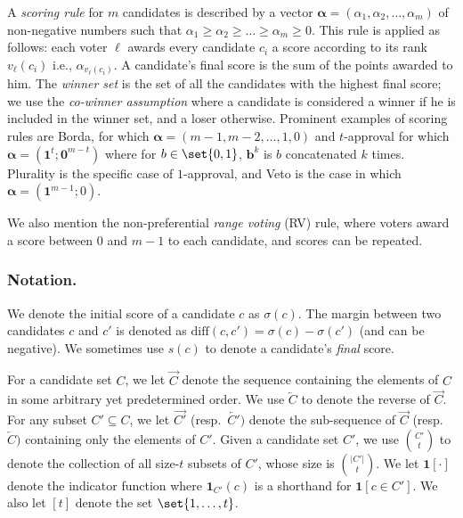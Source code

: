 \documentclass[letterpaper]{article} %
\newcommand{\indic}{\mathbf{1}}
\newcommand{\vecc}{\mathbf}
\newcommand{\vecgreek}{\bm}
\newcommand{\veca}{\vecgreek{\alpha}}
\newcommand{\ora}[1]{\overrightarrow{#1}}
\newcommand{\ola}[1]{\overleftarrow{#1}}
\newcommand{\abs}[1]{\lvert{#1}\rvert}
\newcommand{\diff}{\mathrm{diff}}
\begin{document}
A \emph{scoring rule} for $m$ candidates is described by a vector $\veca=\left(\alpha_1,\alpha_2,\ldots,\alpha_m\right)$ of non-negative numbers such that $\alpha_1 \geq \alpha_2 \geq \dots \geq \alpha_m \geq 0$.
This rule is applied as follows: each voter $\ell$ awards every candidate $c_i$ a score according to its rank $v_\ell(c_i)$ i.e., $\alpha_{v_\ell(c_i)}$. A candidate's final score is the sum of the points awarded to him.
The \emph{winner set} is the set of all the candidates with the highest final score; we use the \emph{co-winner assumption} where a candidate is considered a winner if he is included in the winner set, and a loser otherwise. Prominent examples of scoring rules are  Borda, for which  $\veca=(m-1,m-2,\ldots,1,0)$ and $t$-approval for which $\veca=(\vecc{1}^t;\vecc{0}^{m-t})$ where for $b \in \set{0,1}$,  $\vecc{b}^{k}$  is $b$ concatenated $k$ times.
Plurality is the specific case of $1$-approval, and Veto is the case in which $\veca=(\vecc{1}^{m-1};0)$.

We also mention the non-preferential \emph{range voting} (RV)  rule, where voters award a score between $0$ and $m-1$ to each candidate, and scores can be repeated.

\subsubsection{Notation.} We denote the initial score of a candidate $c$ as $\sigma(c)$. The margin between two candidates $c$ and $c'$ is denoted as $\diff(c,c') = \sigma(c) - \sigma(c')$  (and can be negative). We sometimes use $s(c)$ to denote a candidate's \emph{final} score.

For a candidate set $C$, we let $\ora{C}$ denote the sequence containing the elements of $C$ in some arbitrary yet predetermined order. We use  $\ola{C}$ to denote the reverse of $\ora{C}$. For any subset $C' \subseteq C$, we let $\ora{C'}$ (resp.\ $\ola{C'})$ denote the sub-sequence of $\ora{C}$ (resp.\ $\ola{C})$ containing only the elements of $C'$. 
Given a candidate set $C'$, we use $\binom{C'}{t}$ to denote the collection of all size-$t$ subsets of $C'$, whose size is $\binom{\abs{C'}}{t}$. We let $\indic[\cdot]$ denote the indicator function where $\indic_{C'}(c)$ is a shorthand for $\indic[c \in C']$.
We also let $[t]$ denote the set $\set{1,\ldots,t}$.
\end{document}
